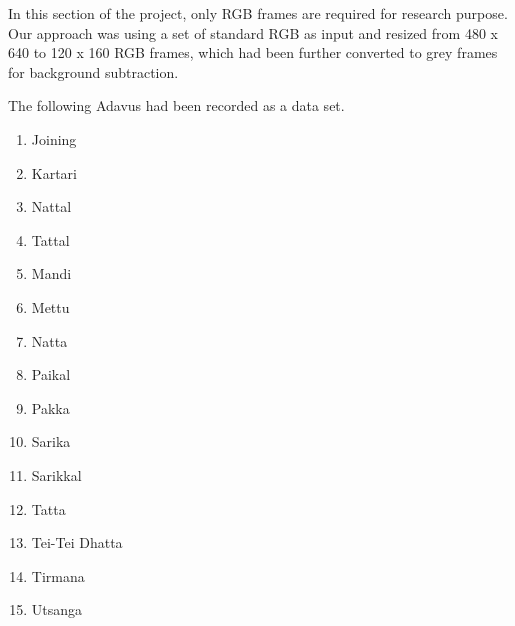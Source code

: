 In this section of the project, only RGB frames are required for research purpose. Our approach was using a set of standard RGB as input and resized from 480 x 640 to 120 x 160 RGB frames, which had been further converted to grey frames for background subtraction.


The following Adavus had been recorded as a data set.
\begin{enumerate}
    \item Joining
    \item Kartari
    \item Nattal 
    \item Tattal 
    \item Mandi
    \item Mettu 
    \item Natta 
    \item Paikal
    \item Pakka
    \item Sarika 
    \item Sarikkal
    \item Tatta 
    \item Tei-Tei Dhatta
    \item Tirmana
    \item Utsanga
\end{enumerate}

